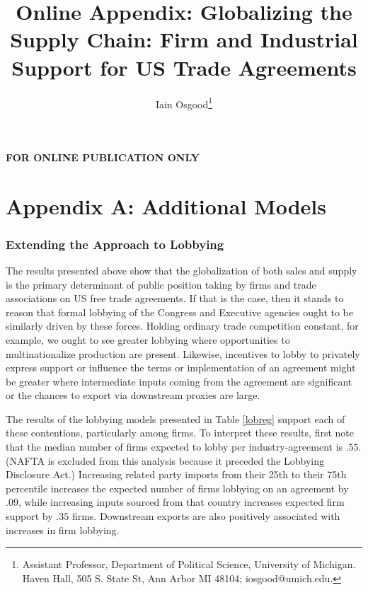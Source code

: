 \documentclass[hidelinks,12pt,letter]{article}
\date{}
\title{\TitleFont \textbf{Online Appendix}: Globalizing the Supply Chain: Firm and Industrial Support for US Trade Agreements}
\author{Iain Osgood\thanks{Assistant Professor, Department of Political Science, University of Michigan. Haven Hall, 505 S. State St, Ann Arbor MI 48104; iosgood@umich.edu.}}
\begin{document}
\maketitle

\small




\newpage 

\bigskip



\FloatBarrier

\newpage \footnotesize
\setcounter{table}{0}
\renewcommand{\thetable}{A\arabic{table}}
\setcounter{figure}{0}
\renewcommand{\thefigure}{A\arabic{figure}}



\newpage


\begin{center}
\textbf{\uppercase{\huge{For Online Publication Only}}}
\end{center}
\section*{Appendix A: Additional Models}

\FloatBarrier

\subsubsection*{Extending the Approach to Lobbying}
The results presented above show that the globalization of both sales and supply is the primary determinant of public position taking by firms and trade associations on US free trade agreements. If that is the case, then it stands to reason that formal lobbying of the Congress and Executive agencies ought to be similarly driven by these forces. Holding ordinary trade competition constant, for example, we ought to see greater lobbying where opportunities to multinationalize production are present. Likewise, incentives to lobby to privately express support or influence the terms or implementation of an agreement might be greater where intermediate inputs coming from the agreement are significant or the chances to export via downstream proxies are large. 

The results of the lobbying models presented in Table \ref{lobreg} support each of these contentions, particularly among firms. To interpret these results, first note that the median number of firms expected to lobby per industry-agreement is $.55$. (NAFTA is excluded from this analysis because it preceded the Lobbying Disclosure Act.) Increasing related party imports from their 25th to their 75th percentile increases the expected number of firms lobbying on an agreement by $.09$, while increasing inputs sourced from that country increases expected firm support by $.35$ firms. Downstream exports are also positively associated with increases in firm lobbying.
\end{document}
